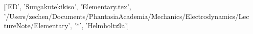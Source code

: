 ['ED', 'Suugakutekikiso', 'Elementary.tex', '/Users/zechen/Documents/PhantasiaAcademia/Mechanics/Electrodynamics/LectureNote/Elementary', '*', 'Helmholtz\xae\x9a']
